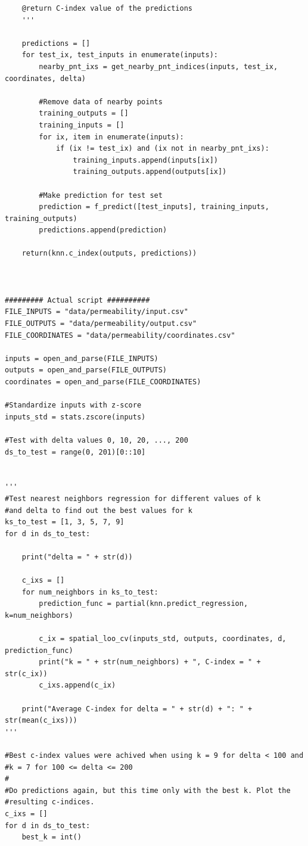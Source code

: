 \documentclass[a4paper]{article}
\begin{document}
\begin{lstlisting}
    @return C-index value of the predictions
    '''

    predictions = []
    for test_ix, test_inputs in enumerate(inputs):
        nearby_pnt_ixs = get_nearby_pnt_indices(inputs, test_ix, coordinates, delta)

        #Remove data of nearby points
        training_outputs = []
        training_inputs = []
        for ix, item in enumerate(inputs): 
            if (ix != test_ix) and (ix not in nearby_pnt_ixs):
                training_inputs.append(inputs[ix])
                training_outputs.append(outputs[ix])

        #Make prediction for test set
        prediction = f_predict([test_inputs], training_inputs, training_outputs)
        predictions.append(prediction)

    return(knn.c_index(outputs, predictions))



######### Actual script ##########
FILE_INPUTS = "data/permeability/input.csv"
FILE_OUTPUTS = "data/permeability/output.csv"
FILE_COORDINATES = "data/permeability/coordinates.csv"

inputs = open_and_parse(FILE_INPUTS)
outputs = open_and_parse(FILE_OUTPUTS)
coordinates = open_and_parse(FILE_COORDINATES)

#Standardize inputs with z-score
inputs_std = stats.zscore(inputs)

#Test with delta values 0, 10, 20, ..., 200
ds_to_test = range(0, 201)[0::10]


'''
#Test nearest neighbors regression for different values of k
#and delta to find out the best values for k
ks_to_test = [1, 3, 5, 7, 9]
for d in ds_to_test:

    print("delta = " + str(d))

    c_ixs = []
    for num_neighbors in ks_to_test:    
        prediction_func = partial(knn.predict_regression, k=num_neighbors)

        c_ix = spatial_loo_cv(inputs_std, outputs, coordinates, d, prediction_func)
        print("k = " + str(num_neighbors) + ", C-index = " + str(c_ix))
        c_ixs.append(c_ix)
    
    print("Average C-index for delta = " + str(d) + ": " + str(mean(c_ixs)))
'''

#Best c-index values were achived when using k = 9 for delta < 100 and
#k = 7 for 100 <= delta <= 200
#
#Do predictions again, but this time only with the best k. Plot the 
#resulting c-indices.
c_ixs = []
for d in ds_to_test:
    best_k = int()


\end{lstlisting}
\end{document}
